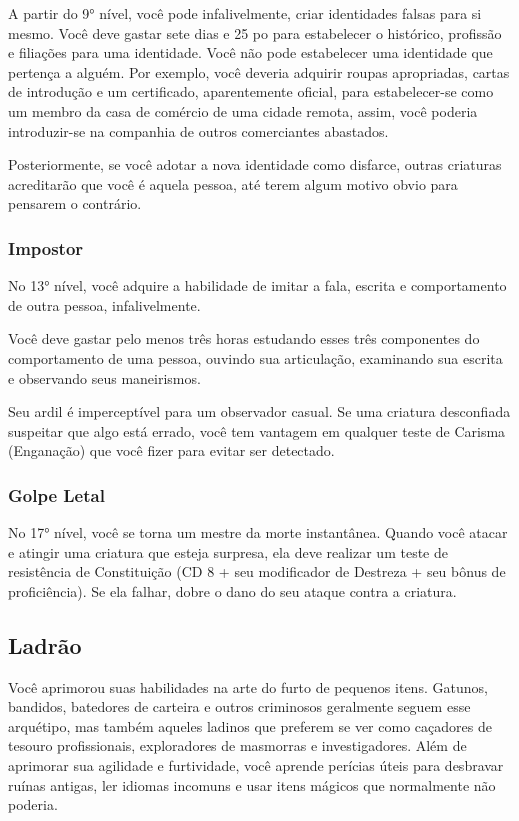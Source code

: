 \documentclass{RPG_Adventure}[2021/10/20]
\begin{document}
A partir do 9° nível, você pode infalivelmente, criar identidades falsas para si
mesmo. Você deve gastar sete dias e 25 po para estabelecer o histórico,
profissão e filiações para uma identidade. Você não pode estabelecer uma
identidade que pertença a alguém. Por exemplo, você deveria adquirir roupas
apropriadas, cartas de introdução e um certificado, aparentemente oficial, para
estabelecer-se como um membro da casa de comércio de uma cidade remota, assim,
você poderia introduzir-se na companhia de outros comerciantes abastados.

Posteriormente, se você adotar a nova identidade como disfarce, outras criaturas
acreditarão que você é aquela pessoa, até terem algum motivo obvio para pensarem
o contrário.

\subsubsection{Impostor}%
\label{ssub:impostor}

No 13° nível, você adquire a habilidade de imitar a fala, escrita e
comportamento de outra pessoa, infalivelmente.

Você deve gastar pelo menos três horas estudando esses três componentes do
comportamento de uma pessoa, ouvindo sua articulação, examinando sua escrita e
observando seus maneirismos.

Seu ardil é imperceptível para um observador casual. Se uma criatura desconfiada
suspeitar que algo está errado, você tem vantagem em qualquer teste de Carisma
(Enganação) que você fizer para evitar ser detectado.

\subsubsection{Golpe Letal}%
\label{ssub:golpe_letal}

No 17° nível, você se torna um mestre da morte instantânea. Quando você atacar e
atingir uma criatura que esteja surpresa, ela deve realizar um teste de
resistência de Constituição (CD 8 + seu modificador de Destreza + seu bônus de
proficiência). Se ela falhar, dobre o dano do seu ataque contra a criatura.

\subsection*{Ladrão}%
\label{sub:ladrao}

Você aprimorou suas habilidades na arte do furto de pequenos itens. Gatunos,
bandidos, batedores de carteira e outros criminosos geralmente seguem esse
arquétipo, mas também aqueles ladinos que preferem se ver como caçadores de
tesouro profissionais, exploradores de masmorras e investigadores. Além de
aprimorar sua agilidade e furtividade, você aprende perícias úteis para
desbravar ruínas antigas, ler idiomas incomuns e usar itens mágicos que
normalmente não poderia.
\end{document}
